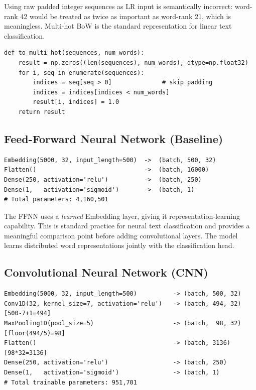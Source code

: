 \documentclass[12pt,a4paper]{article}
\begin{document}
Using raw padded integer sequences as LR input is semantically incorrect: word-rank 42
would be treated as twice as important as word-rank 21, which is meaningless. Multi-hot
BoW is the standard representation for linear text classification.

\begin{lstlisting}[caption={Bag-of-Words encoding}]
def to_multi_hot(sequences, num_words):
    result = np.zeros((len(sequences), num_words), dtype=np.float32)
    for i, seq in enumerate(sequences):
        indices = seq[seq > 0]              # skip padding
        indices = indices[indices < num_words]
        result[i, indices] = 1.0
    return result
\end{lstlisting}

\subsection{Feed-Forward Neural Network (Baseline)}

\begin{lstlisting}[caption={FFNN architecture}]
Embedding(5000, 32, input_length=500)  ->  (batch, 500, 32)
Flatten()                              ->  (batch, 16000)
Dense(250, activation='relu')          ->  (batch, 250)
Dense(1,   activation='sigmoid')       ->  (batch, 1)
# Total parameters: 4,160,501
\end{lstlisting}

The FFNN uses a \emph{learned} Embedding layer, giving it representation-learning
capability. This is standard practice for neural text classification and provides a
meaningful comparison point before adding convolutional layers. The model learns
distributed word representations jointly with the classification head.

\subsection{Convolutional Neural Network (CNN)}

\begin{lstlisting}[caption={CNN architecture with dimension walkthrough}]
Embedding(5000, 32, input_length=500)          -> (batch, 500, 32)
Conv1D(32, kernel_size=7, activation='relu')   -> (batch, 494, 32) [500-7+1=494]
MaxPooling1D(pool_size=5)                      -> (batch,  98, 32) [floor(494/5)=98]
Flatten()                                      -> (batch, 3136)    [98*32=3136]
Dense(250, activation='relu')                  -> (batch, 250)
Dense(1,   activation='sigmoid')               -> (batch, 1)
# Total trainable parameters: 951,701
\end{lstlisting}
\end{document}
